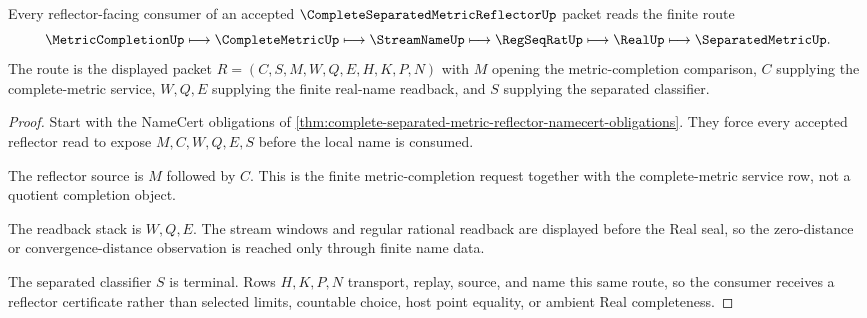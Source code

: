 \begin{theorem}
\label{thm:complete-separated-metric-reflector-adjunction-route}
Every reflector-facing consumer of an accepted $\CompleteSeparatedMetricReflectorUp$ packet reads the finite route
$$
\MetricCompletionUp \longmapsto \CompleteMetricUp \longmapsto \StreamNameUp \longmapsto \RegSeqRatUp \longmapsto \RealUp \longmapsto \SeparatedMetricUp .
$$
The route is the displayed packet $R=(C,S,M,W,Q,E,H,K,P,N)$ with $M$ opening the metric-completion comparison, $C$ supplying the complete-metric service, $W,Q,E$ supplying the finite real-name readback, and $S$ supplying the separated classifier.
\end{theorem}
\begin{proof}
Start with the NameCert obligations of \autoref{thm:complete-separated-metric-reflector-namecert-obligations}. They force every accepted reflector read to expose $M,C,W,Q,E,S$ before the local name is consumed.

The reflector source is $M$ followed by $C$. This is the finite metric-completion request together with the complete-metric service row, not a quotient completion object.

The readback stack is $W,Q,E$. The stream windows and regular rational readback are displayed before the Real seal, so the zero-distance or convergence-distance observation is reached only through finite name data.

The separated classifier $S$ is terminal. Rows $H,K,P,N$ transport, replay, source, and name this same route, so the consumer receives a reflector certificate rather than selected limits, countable choice, host point equality, or ambient Real completeness.
\end{proof}

